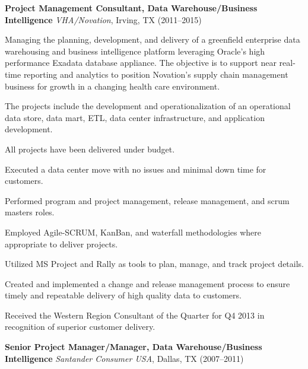 \documentclass{article}
\newcommand{\sbt}{\,\begin{picture}(-1,1)(-1,-3)\circle*{3}\end{picture}\ }
\begin{document}
\noindent
{\bfseries Project Management Consultant, Data Warehouse/Business Intelligence} {\itshape VHA/Novation}, Irving, TX (2011--2015)
\begin{compactitem}

\item[\sbt] Managing the planning, development, and delivery of a greenfield enterprise data warehousing and business intelligence platform leveraging Oracle's high performance Exadata database appliance. The objective is to support near real-time reporting and analytics to position Novation's supply chain management business for growth in a changing health care environment.
\item[\sbt] The projects include the development and operationalization of an operational data store, data mart, ETL, data center infrastructure, and application development.
\item[\sbt] All projects have been delivered under budget.
\item[\sbt] Executed a data center move with no issues and minimal down time for customers.
\item[\sbt] Performed program and project management, release management, and scrum masters roles.
\item[\sbt] Employed Agile-SCRUM, KanBan, and waterfall methodologies where appropriate to deliver projects.
\item[\sbt] Utilized MS Project and Rally as tools to plan, manage, and track project details.
\item[\sbt] Created and implemented a change and release management process to ensure timely and repeatable delivery of high quality data to customers.
\item[\sbt] Received the Western Region Consultant of the Quarter for Q4 2013 in recognition of superior customer delivery.

\end{compactitem}

\smallskip

\noindent
{\bfseries Senior Project Manager/Manager, Data Warehouse/Business Intelligence} {\itshape Santander Consumer USA}, Dallas, TX (2007--2011)
\end{document}
